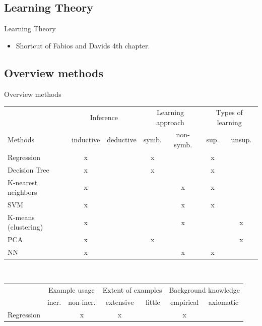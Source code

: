 \documentclass{beamer}
\begin{document}
	


\subsection{Learning Theory}
	\begin{frame}{Learning Theory}
		\begin{itemize}
			\item Shortcut of Fabios and Davids 4th chapter.
		\end{itemize}
	\end{frame}

	


\subsection{Overview methods}
	\begin{frame}{Overview methods}
    \begin{tiny}
		\begin{tabular}{l|cc|cc|cc|}
			\hline
		    {}			& \multicolumn{2}{c}{Inference} & \multicolumn{2}{c}{Learning approach} & \multicolumn{2}{c}{Types of learning}  \\
			Methods		& inductive & deductive			& symb. & non-symb.		& sup. & unsup. \\ \hline
            Regression  & x & {}   & x & {}   & x & {}    \\ \hline
            Decision Tree & x & {}  & x & {}  & x & {}  \\ \hline
            K-nearest neighbors & x & {}  & {} & x  & x & {}  \\ \hline
            SVM  & x & {}  & {} & x  & x & {}  \\ \hline
            K-means (clustering)  & x & {}  & {} & x  & {} & x  \\ \hline
            PCA & x & {}   & x & {}   & {} & x   \\ \hline
            NN  & x & {}  & {} & x  & x & {}  \\
			\hline
		\end{tabular} \\ 
        \bigskip
        \bigskip
        \begin{tabular}{l|cc|cc|cc|}
			\hline
		    {}		 & \multicolumn{2}{c}{Example usage} & \multicolumn{2}{c}{Extent of examples} & \multicolumn{2}{c}{Background knowledge} \\
			{}	& incr. & non-incr. 	& extensive & little		& empirical & axiomatic\\ \hline
            Regression   & {} & x  & x & {}  & x & {} \\ \hline

\end{tabular}
\end{tiny}
\end{frame}
\end{document}
